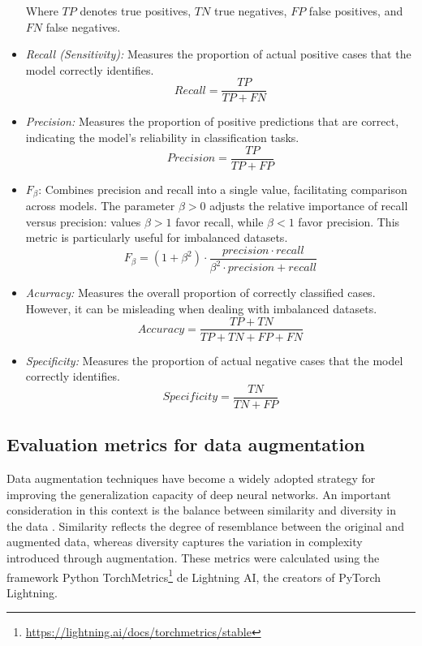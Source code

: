 \documentclass[journal]{IEEEtran}
\begin{document}
\begin{itemize}
Where $TP$ denotes true positives, $TN$ true negatives, $FP$ false positives, and $FN$ false negatives.
\item \textit{Recall (Sensitivity):} Measures the proportion of actual positive cases that the model correctly identifies.
\begin{equation}
Recall=\frac{TP}{TP+FN}
\end{equation}
\item \textit{Precision:} Measures the proportion of positive predictions that are correct, indicating the model’s reliability in classification tasks.
\begin{equation}
Precision=\frac{TP}{TP+FP}
\end{equation}
\item $F_\beta$: Combines precision and recall into a single value, facilitating comparison across models. The parameter $\beta > 0$ adjusts the relative importance of recall versus precision: values $\beta>1$ favor recall, while $\beta<1$ favor precision. This metric is particularly useful for imbalanced datasets.
\begin{equation}
F_\beta=(1+\beta^2)\cdot \frac{precision\cdot recall}{\beta^2 \cdot precision+recall}
\end{equation}
\item \textit{Acurracy:} Measures the overall proportion of correctly classified cases. However, it can be misleading when dealing with imbalanced datasets.
\begin{equation}
Accuracy=\frac{TP+TN}{TP+TN+FP+FN}
\end{equation}
\item \textit{Specificity:} Measures the proportion of actual negative cases that the model correctly identifies.
\begin{equation}
Specificity=\frac{TN}{TN+FP}
\end{equation}
\end{itemize}


\subsection{Evaluation metrics for data augmentation}
Data augmentation techniques have become a widely adopted strategy for improving the generalization capacity of deep neural networks. An important consideration in this context is the balance between similarity and diversity in the data \cite{yang2024investigating}. Similarity reflects the degree of resemblance between the original and augmented data, whereas diversity captures the variation in complexity introduced through augmentation. 
These metrics were calculated using the framework Python TorchMetrics\footnote{\href{https://lightning.ai/docs/torchmetrics/stable}{\color{blue}https://lightning.ai/docs/torchmetrics/stable}} de Lightning AI, the creators of PyTorch Lightning.
\end{document}
